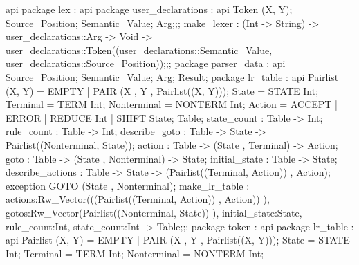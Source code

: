 api {   package lex
          : api {   package user_declarations
                      : api {
                            Token (X, Y);
                            Source_Position;
                            Semantic_Value;
                            Arg;};;
                    make_lexer :
                        (Int -> String)
                        ->
                        user_declarations::Arg
                        ->
                        Void
                        ->
                        user_declarations::Token((user_declarations::Semantic_Value, user_declarations::Source_Position));};;
        package parser_data
          : api {
                Source_Position;
                Semantic_Value;
                Arg;
                Result;
                    package lr_table
                      : api {
                            Pairlist (X, Y) = EMPTY | PAIR (X , Y , Pairlist((X, Y)));
                            State  = STATE Int;
                            Terminal  = TERM Int;
                            Nonterminal  = NONTERM Int;
                            Action  = ACCEPT | ERROR | REDUCE Int | SHIFT State;
                            Table;
                            state_count : Table -> Int;
                            rule_count : Table -> Int;
                            describe_goto : Table -> State -> Pairlist((Nonterminal, State));
                            action : Table -> (State , Terminal) -> Action;
                            goto : Table -> (State , Nonterminal) -> State;
                            initial_state : Table -> State;
                            describe_actions : Table -> State -> (Pairlist((Terminal, Action)) , Action);
                            exception GOTO (State , Nonterminal);
                                make_lr_table :
                                        {actions:Rw_Vector(((Pairlist((Terminal, Action)) , Action)) ),
                                        gotos:Rw_Vector(Pairlist((Nonterminal, State)) ), initial_state:State, rule_count:Int,
                                        state_count:Int}
                                    ->
                                    Table;};;
                    package token
                      : api {   package lr_table
                                  : api {
                                        Pairlist (X, Y) = EMPTY | PAIR (X , Y , Pairlist((X, Y)));
                                        State  = STATE Int;
                                        Terminal  = TERM Int;
                                        Nonterminal  = NONTERM Int;
}}}}
